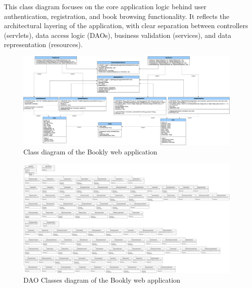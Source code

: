 This class diagram focuses on the core application logic behind user authentication, registration, and book browsing functionality. It reflects the architectural layering of the application, with clear separation between controllers (servlets), data access logic (DAOs), business validation (services), and data representation (resources).



\begin{figure}[h]
    \centering
    \includegraphics[width=\textwidth]{HW1Report/photos/ClassDiagram.png}
    \caption{Class diagram of the Bookly web application}
    \label{fig:classdiagram}
\end{figure}

\begin{figure}[h]
    \centering
    \includegraphics[width=\textwidth]{HW1Report/photos/dao-class-diagram.png}
    \caption{DAO Classes diagram of the Bookly web application}
    \label{fig:daoclassdiagram}
\end{figure}